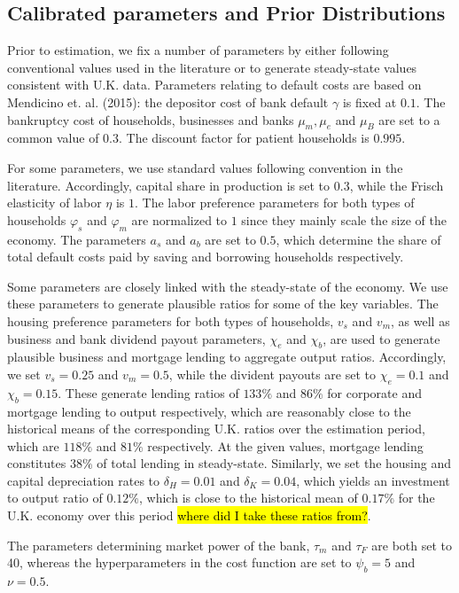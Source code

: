 \documentclass[12pt]{article}
\numberwithin{equation}{section}
\begin{document}
\subsection*{Calibrated parameters and Prior Distributions }

Prior to estimation, we fix a number of parameters by either following conventional values used in the literature or to generate steady-state values consistent with U.K. data. Parameters relating to default costs are based on Mendicino et. al. (2015): the depositor cost of bank default $\gamma$ is fixed at $0.1$. The bankruptcy cost of households, businesses and banks $\mu_m, \mu_e$ and $\mu_B$ are set to a common value of $0.3$. The discount factor for patient households is $0.995$. 


For some parameters, we use standard values following convention in the literature. Accordingly, capital share in production is set to $0.3$, while the Frisch elasticity of labor $\eta$ is $1$. The labor preference parameters for both types of households $\varphi_s$ and $\varphi_m$ are normalized to $1$ since they mainly scale the size of the economy. The parameters $a_s$ and $a_b$ are set to $0.5$, which determine the share of total default costs paid by saving and borrowing households respectively. 


Some parameters are closely linked with the steady-state of the economy. We use these parameters to generate plausible ratios for some of the key variables. The housing preference parameters for both types of households, $v_s$ and $v_m$, as well as business and bank dividend payout parameters, $\chi_e$ and $\chi_b$, are used to generate plausible business and mortgage lending to aggregate output ratios.  Accordingly, we set $v_s=0.25$ and $v_m=0.5$, while the divident payouts are set to $\chi_e=0.1$ and $\chi_b=0.15$. These generate lending ratios of $133 \%$ and $86 \%$ for corporate and mortgage lending to output respectively, which are reasonably close to the historical means of the corresponding U.K. ratios over the estimation period, which are $118 \%$ and $81 \%$ respectively. At the given values, mortgage lending constitutes $38 \%$ of total lending in steady-state. Similarly, we set the housing and capital depreciation rates to $\delta_H=0.01$ and $\delta_K=0.04$, which yields an investment to output ratio of $0.12 \%$, which is close to the historical mean of $0.17 \%$ for the U.K. economy over this period \hl{where did I take these ratios from?}. 

The parameters determining market power of the bank, $\tau_m$ and $\tau_F$ are both set to 40, whereas the hyperparameters in the cost function are set to $\psi_b=5$ and $\nu=0.5$. 
\end{document}
